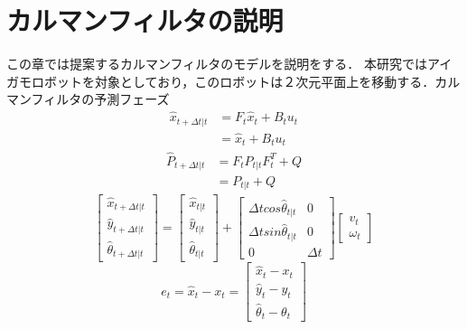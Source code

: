 \documentclass[a4paper]{article}
\begin{document}
\section{カルマンフィルタの説明}
この章では提案するカルマンフィルタのモデルを説明をする．
本研究ではアイガモロボットを対象としており，このロボットは２次元平面上を移動する．カルマンフィルタの予測フェーズ
\begin{align}
    \hat{x}_{t+ \Delta t|t} &= F_{t} \hat{x}_{t} + B_{t} u_{t} \nonumber \\
                            &= \hat{x}_{t} + B_{t} u_{t}
    \label{eq:1}
\end{align}
%
%
\begin{align}
    \hat{P}_{t+ \Delta t|t} &= F_{t} P_{t|t} F_{t}^{T} + Q \nonumber \\
                            &= P_{t|t} + Q
    \label{eq:2}
\end{align}
%
%
\begin{equation}
    \begin{bmatrix}
    \hat{x}_{t+ \Delta t|t} \\
    \hat{y}_{t+ \Delta t|t} \\
    \hat{\theta}_{t+ \Delta t|t}
    \end{bmatrix} 
    =
    \begin{bmatrix}
        \hat{x}_{t|t} \\
        \hat{y}_{t|t} \\
        \hat{\theta}_{t|t}
    \end{bmatrix} 
    +
    \begin{bmatrix}
        \Delta t cos\hat{\theta}_{t|t} &0 \\
        \Delta t sin\hat{\theta}_{t|t} &0 \\
        0                              &{\Delta}t
    \end{bmatrix}
    \begin{bmatrix}
        v_{t} \\
        \omega_{t}
    \end{bmatrix}
    \label{eq:3} 
\end{equation}
%
%
\begin{equation}
    e_{t} = \hat{x}_{t} - x_{t} =
    \begin{bmatrix}
        \hat{x}_{t} - x_{t} \\
        \hat{y}_{t} - y_{t} \\
        \hat{\theta}_{t} - \theta_{t}
    \end{bmatrix}
    \label{eq:4}
\end{equation}
%
%
\end{document}
